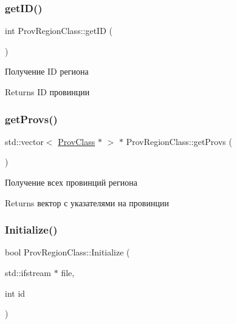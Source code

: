 \subsubsection{\texorpdfstring{get\+I\+D()}{getID()}}
{\footnotesize\ttfamily int Prov\+Region\+Class\+::get\+ID (\begin{DoxyParamCaption}{ }\end{DoxyParamCaption})\hspace{0.3cm}{\ttfamily [virtual]}}



Получение ID региона 

\begin{DoxyReturn}{Returns}
ID провинции 
\end{DoxyReturn}
\mbox{\label{class_prov_region_class_a31c1bdb93bda5a0bd0fc66382d39473e}} 
\subsubsection{\texorpdfstring{get\+Provs()}{getProvs()}}
{\footnotesize\ttfamily std\+::vector$<$ \hyperlink{class_prov_class}{Prov\+Class} $\ast$ $>$ $\ast$ Prov\+Region\+Class\+::get\+Provs (\begin{DoxyParamCaption}{ }\end{DoxyParamCaption})\hspace{0.3cm}{\ttfamily [virtual]}}



Получение всех провинций региона 

\begin{DoxyReturn}{Returns}
вектор с указателями на провинции 
\end{DoxyReturn}
\mbox{\label{class_prov_region_class_a733b3a8580bd1bb038295a5b8ab4f1a0}} 
\subsubsection{\texorpdfstring{Initialize()}{Initialize()}}
{\footnotesize\ttfamily bool Prov\+Region\+Class\+::\+Initialize (\begin{DoxyParamCaption}\item[{std\+::ifstream $\ast$}]{file,  }\item[{int}]{id }\end{DoxyParamCaption})\hspace{0.3cm}{\ttfamily [virtual]}}




